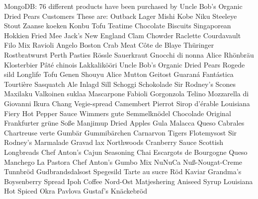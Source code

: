 \documentclass{article}
\begin{document}
\begin{pythonOutput}
MongoDB: 76 different products have been purchased by Uncle Bob's Organic Dried Pears Customers
These are:
Outback Lager
Mishi Kobe Niku
Steeleye Stout
Zaanse koeken
Konbu
Tofu
Teatime Chocolate Biscuits
Singaporean Hokkien Fried Mee
Jack's New England Clam Chowder
Raclette Courdavault
Filo Mix
Ravioli Angelo
Boston Crab Meat
Côte de Blaye
Thüringer Rostbratwurst
Perth Pasties
Rössle Sauerkraut
Gnocchi di nonna Alice
Rhönbräu Klosterbier
Pâté chinois
Lakkalikööri
Uncle Bob's Organic Dried Pears
Rogede sild
Longlife Tofu
Genen Shouyu
Alice Mutton
Geitost
Guaraná Fantástica
Tourtière
Sasquatch Ale
Inlagd Sill
Schoggi Schokolade
Sir Rodney's Scones
Maxilaku
Valkoinen suklaa
Mascarpone Fabioli
Gorgonzola Telino
Mozzarella di Giovanni
Ikura
Chang
Vegie-spread
Camembert Pierrot
Sirop d'érable
Louisiana Fiery Hot Pepper Sauce
Wimmers gute Semmelknödel
Chocolade
Original Frankfurter grüne Soße
Manjimup Dried Apples
Gula Malacca
Queso Cabrales
Chartreuse verte
Gumbär Gummibärchen
Carnarvon Tigers
Flotemysost
Sir Rodney's Marmalade
Gravad lax
Northwoods Cranberry Sauce
Scottish Longbreads
Chef Anton's Cajun Seasoning
Chai
Escargots de Bourgogne
Queso Manchego La Pastora
Chef Anton's Gumbo Mix
NuNuCa Nuß-Nougat-Creme
Tunnbröd
Gudbrandsdalsost
Spegesild
Tarte au sucre
Röd Kaviar
Grandma's Boysenberry Spread
Ipoh Coffee
Nord-Ost Matjeshering
Aniseed Syrup
Louisiana Hot Spiced Okra
Pavlova
Gustaf's Knäckebröd
\end{pythonOutput}
\end{document}
